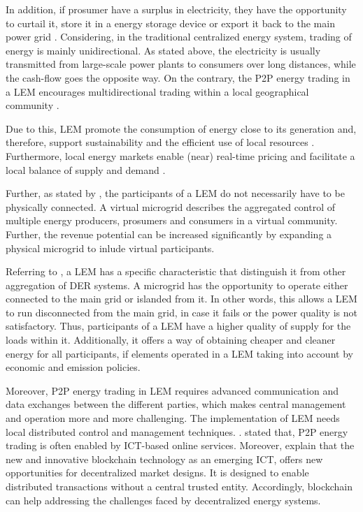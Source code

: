 In addition, if prosumer have a surplus in electricity, they have the opportunity 
to curtail it, store it in a energy storage device or export it back to the main power grid .
Considering, in the traditional centralized energy system, trading of energy is mainly unidirectional.
As stated above, the electricity is usually transmitted from large-scale power plants to 
consumers over long distances, while the cash-flow goes the opposite way. 
On the contrary, the P2P energy trading in a LEM encourages multidirectional trading within 
a local geographical community .

Due to this, LEM promote the consumption of energy close to its generation and, therefore, 
support sustainability and the efficient use of local resources .
Furthermore, local energy markets enable (near) real-time pricing and facilitate a local balance
of supply and demand . 

Further, as stated by ,
the participants of a LEM do not necessarily have to be physically connected. A virtual microgrid
describes the aggregated control of multiple energy producers, prosumers and consumers in a virtual 
community. Further, the revenue potential can be increased significantly by expanding a physical 
microgrid to inlude virtual participants. 

Referring to , a LEM has a specific characteristic
that distinguish it from other aggregation of DER systems. A microgrid has the opportunity
to operate either connected to the main grid or islanded from it. In other words,
this allows a LEM to run disconnected from the main grid, in case it fails or 
the power quality is not satisfactory. Thus, participants of a LEM have a higher quality 
of supply for the loads within it. Additionally, it offers a way of obtaining cheaper 
and cleaner energy for all participants, if elements operated in a LEM taking into 
account by economic and emission policies.

Moreover, P2P energy trading in LEM requires advanced communication and data 
exchanges between the different parties, which makes central management and 
operation more and more challenging. The implementation of LEM needs 
local distributed control and management techniques. . 
 stated that, P2P energy trading is often
enabled by ICT-based online services. Moreover,  explain that 
the new and innovative blockchain technology as an emerging ICT, 
offers new opportunities for decentralized market designs.
It is designed to enable distributed transactions without 
a central trusted entity.
Accordingly, blockchain can help addressing the challenges faced by 
decentralized energy systems. 

